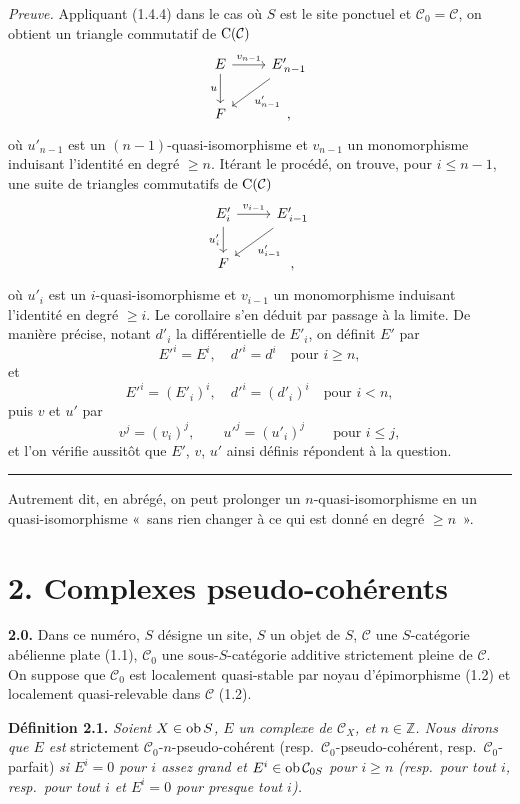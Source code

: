\documentclass[11pt]{article}
\begin{document}
\emph{Preuve.} Appliquant (1.4.4) dans le cas où \(S\) est le site ponctuel et \(\mathcal C_0=\mathcal C\), on obtient un triangle commutatif de \(\mathrm C(\mathcal C)\)
\[
\begin{tikzcd}
E \arrow[r,"v_{n-1}"] \arrow[d,"u"'] & E'_{\,n-1} \arrow[dl,"u'_{n-1}"]\\
F & ,
\end{tikzcd}
\]
où \(u'_{n-1}\) est un \((n-1)\)-quasi-isomorphisme et \(v_{n-1}\) un monomorphisme induisant l'identité en degré \(\geq n\). Itérant le procédé, on trouve, pour \(i\leq n-1\), une suite de triangles commutatifs de \(\mathrm C(\mathcal C)\)
\[
\begin{tikzcd}
E'_i \arrow[r,"v_{i-1}"] \arrow[d,"u'_i"'] & E'_{\,i-1} \arrow[dl,"u'_{i-1}"]\\
F & ,
\end{tikzcd}
\]
où \(u'_i\) est un \(i\)-quasi-isomorphisme et \(v_{i-1}\) un monomorphisme induisant l'identité en degré \(\geq i\). Le corollaire s'en déduit par passage à la limite. De manière précise, notant \(d'_i\) la différentielle de \(E'_i\), on définit \(E'\) par
\[
  E'^i=E^i,\quad d'^i=d^i\quad\text{pour }i\geq n,
\]
et
\[
  E'^i=(E'_i)^i,\quad d'^i=(d'_i)^i\quad\text{pour }i<n,
\]
puis \(v\) et \(u'\) par
\[
  v^j=(v_i)^j,\qquad u'^j=(u'_i)^j\qquad\text{pour }i\leq j,
\]
et l'on vérifie aussitôt que \(E'\), \(v\), \(u'\) ainsi définis répondent à la question.



\medskip\hrule\medskip

Autrement dit, en abrégé, on peut prolonger un \(n\)-quasi-isomorphisme en un quasi-isomorphisme «~sans rien changer à ce qui est donné en degré \(\geq n\)~».

\section*{2. Complexes pseudo-cohérents}

\textbf{2.0.} Dans ce numéro, \(S\) désigne un site, \(S\) un objet de \(S\), \(\mathcal C\) une \(S\)-catégorie abélienne plate (1.1), \(\mathcal C_0\) une sous-\(S\)-catégorie additive strictement pleine de \(\mathcal C\). On suppose que \(\mathcal C_0\) est localement quasi-stable par noyau d'épimorphisme (1.2) et localement quasi-relevable dans \(\mathcal C\) (1.2).

\textbf{Définition 2.1.} \emph{Soient \(X\in\operatorname{ob} S\), \(E\) un complexe de \(\mathcal C_X\), et \(n\in\mathbb Z\). Nous dirons que \(E\) est} strictement \(\mathcal C_0\)-\(n\)-pseudo-cohérent (resp.\ \(\mathcal C_0\)-pseudo-cohérent, resp.\ \(\mathcal C_0\)-parfait) \emph{si \(E^i=0\) pour \(i\) assez grand et \(E^i\in\operatorname{ob}\mathcal C_{0S}\) pour \(i\geq n\) (resp.\ pour tout \(i\), resp.\ pour tout \(i\) et \(E^i=0\) pour presque tout \(i\)).}
\end{document}
